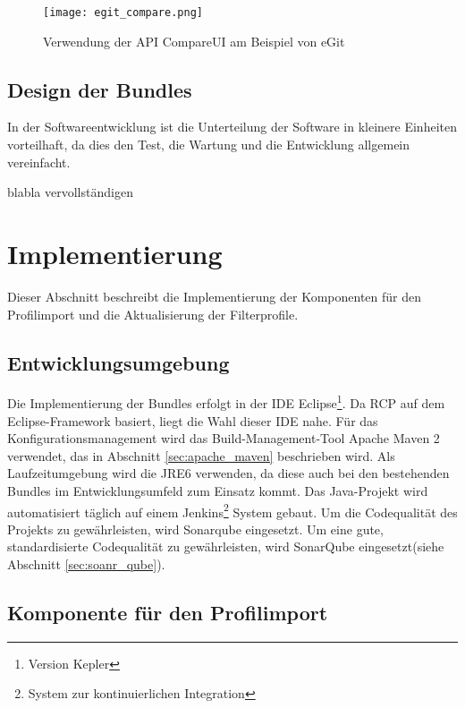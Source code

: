 {{{{\begin{figure}[htbp] 
  \centering
     \texttt{[image: egit\_compare.png]}
  \caption{Verwendung der API CompareUI am Beispiel von eGit}
  \label{fig:egit_compare}
\end{figure}

}



}

}






\subsection{Design der Bundles}{
In der Softwareentwicklung ist die Unterteilung der Software in kleinere Einheiten vorteilhaft, da dies den Test, die Wartung und die Entwicklung allgemein vereinfacht.


blabla vervollständigen

}

\section{Implementierung}{
\label{sec:implementierung}
Dieser Abschnitt beschreibt die Implementierung der Komponenten für den Profilimport und die Aktualisierung der Filterprofile.

\subsection{Entwicklungsumgebung}{
Die Implementierung der Bundles erfolgt in der \ac{IDE} Eclipse\footnote{Version Kepler}. Da \ac{RCP} auf dem Eclipse-Framework basiert, liegt die Wahl dieser \ac{IDE} nahe. Für das Konfigurationsmanagement wird das Build-Management-Tool Apache Maven 2 verwendet, das in Abschnitt \ref{sec:apache_maven} beschrieben wird. Als Laufzeitumgebung wird die \ac{JRE}6 verwenden, da diese auch bei den bestehenden Bundles im Entwicklungsumfeld zum Einsatz kommt. Das Java-Projekt wird automatisiert täglich auf einem Jenkins\footnote{System zur kontinuierlichen Integration} System gebaut. Um die Codequalität des Projekts zu gewährleisten, wird Sonarqube eingesetzt. Um eine gute, standardisierte Codequalität zu gewährleisten, wird SonarQube eingesetzt(siehe Abschnitt \ref{sec:soanr_qube}).
}




\subsection{Komponente für den Profilimport}{
\label{sec:impl_import}

}}}
